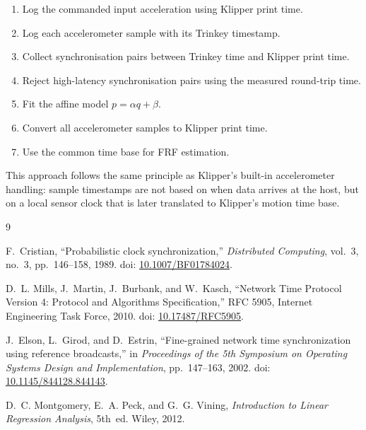 \documentclass[11pt,a4paper]{article}
\begin{document}
\begin{enumerate}
    \item Log the commanded input acceleration using Klipper print time.
    \item Log each accelerometer sample with its Trinkey timestamp.
    \item Collect synchronisation pairs between Trinkey time and Klipper print
    time.
    \item Reject high-latency synchronisation pairs using the measured
    round-trip time.
    \item Fit the affine model \(p = \alpha q + \beta\).
    \item Convert all accelerometer samples to Klipper print time.
    \item Use the common time base for FRF estimation.
\end{enumerate}

This approach follows the same principle as Klipper's built-in accelerometer
handling: sample timestamps are not based on when data arrives at the host, but
on a local sensor clock that is later translated to Klipper's motion time base.

\begin{thebibliography}{9}

F.~Cristian,
\newblock ``Probabilistic clock synchronization,''
\newblock \emph{Distributed Computing}, vol.~3, no.~3, pp.~146--158, 1989.
\newblock doi: \href{https://doi.org/10.1007/BF01784024}{10.1007/BF01784024}.

D.~L. Mills, J.~Martin, J.~Burbank, and W.~Kasch,
\newblock ``Network Time Protocol Version 4: Protocol and Algorithms Specification,''
\newblock RFC 5905, Internet Engineering Task Force, 2010.
\newblock doi: \href{https://doi.org/10.17487/RFC5905}{10.17487/RFC5905}.

J.~Elson, L.~Girod, and D.~Estrin,
\newblock ``Fine-grained network time synchronization using reference broadcasts,''
\newblock in \emph{Proceedings of the 5th Symposium on Operating Systems Design
and Implementation}, pp.~147--163, 2002.
\newblock doi: \href{https://doi.org/10.1145/844128.844143}{10.1145/844128.844143}.

D.~C. Montgomery, E.~A. Peck, and G.~G. Vining,
\newblock \emph{Introduction to Linear Regression Analysis},
\newblock 5th~ed. Wiley, 2012.

\end{thebibliography}
\end{document}
